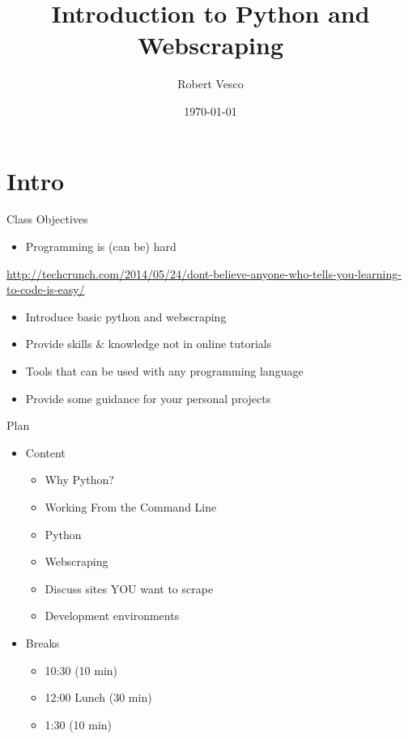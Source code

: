 \documentclass[presentation]{beamer}
\institute[Yale]{Yale School of Management / ILO}
\author{Robert Vesco}
\date{\today}
\title{Introduction to Python and Webscraping}
\begin{document}
\maketitle

\section{Intro}
\label{sec-1}

\begin{frame}[label=sec-1-0-1]{Class Objectives}
\begin{itemize}
\item Programming is (can be) hard
\end{itemize}
\url{http://techcrunch.com/2014/05/24/dont-believe-anyone-who-tells-you-learning-to-code-is-easy/}

\begin{itemize}
\item Introduce basic python and webscraping
\item Provide skills \& knowledge not in online tutorials
\item Tools that can be used with any programming language
\item Provide some guidance for your personal projects
\end{itemize}
\end{frame}

\begin{frame}[label=sec-1-0-2]{Plan}
\begin{itemize}
\item Content
\begin{itemize}
\item Why Python?
\item Working From the Command Line
\item Python
\item Webscraping
\item Discuss sites YOU want to scrape
\item Development environments
\end{itemize}
\item Breaks 
\begin{itemize}
\item 10:30 (10 min)
\item 12:00 Lunch (30 min)
\item 1:30 (10 min)
\end{itemize}
\end{itemize}
\end{frame}
\end{document}
